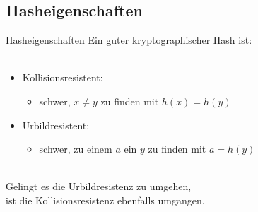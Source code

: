 \documentclass{beamer}
\begin{document}
  \subsection{Hasheigenschaften}
    \begin{frame}{Hasheigenschaften}
      Ein guter kryptographischer Hash ist:\\
      ~\\
      \begin{itemize}
        \setlength{\itemsep}{20pt}
        \item Kollisionsresistent:
        \begin{itemize}
          \item schwer, $ x \neq y $ zu finden mit $ h(x) = h(y) $
        \end{itemize}
        \item Urbildresistent:
        \begin{itemize}
          \item schwer, zu einem $ a $ ein $ y $ zu finden mit $ a = h(y) $
        \end{itemize}
      \end{itemize}
      ~\\
      Gelingt es die Urbildresistenz zu umgehen,\\
      ist die Kollisionsresistenz ebenfalls umgangen.
    \end{frame}
\end{document}

